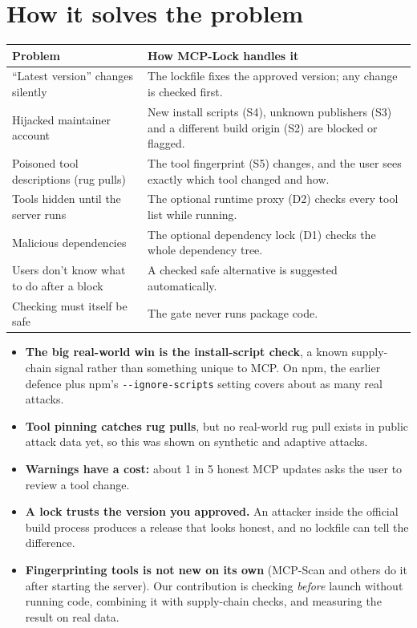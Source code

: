 \documentclass[11pt,a4paper]{article}
\newcommand{\code}[1]{\texttt{#1}}
\begin{document}
\section{How it solves the problem}

\begin{center}
\begin{tabularx}{\textwidth}{@{}>{\raggedright\arraybackslash}p{5.2cm}X@{}}
\toprule
\textbf{Problem} & \textbf{How MCP-Lock handles it} \\
\midrule
``Latest version'' changes silently & The lockfile fixes the approved version; any change is checked first. \\
Hijacked maintainer account & New install scripts (S4), unknown publishers (S3) and a different build origin (S2)
are blocked or flagged. \\
Poisoned tool descriptions (rug pulls) & The tool fingerprint (S5) changes, and the user sees exactly which tool
changed and how. \\
Tools hidden until the server runs & The optional runtime proxy (D2) checks every tool list while running. \\
Malicious dependencies & The optional dependency lock (D1) checks the whole dependency tree. \\
Users don't know what to do after a block & A checked safe alternative is suggested automatically. \\
Checking must itself be safe & The gate never runs package code. \\
\bottomrule
\end{tabularx}
\end{center}

\begin{honest}
\begin{itemize}[leftmargin=*]
  \item \textbf{The big real-world win is the install-script check}, a known supply-chain signal rather than
        something unique to MCP. On npm, the earlier defence plus npm's \code{-{}-ignore-scripts} setting covers about
        as many real attacks.
  \item \textbf{Tool pinning catches rug pulls}, but no real-world rug pull exists in public attack data yet, so
        this was shown on synthetic and adaptive attacks.
  \item \textbf{Warnings have a cost:} about 1 in 5 honest MCP updates asks the user to review a tool change.
  \item \textbf{A lock trusts the version you approved.} An attacker inside the official build process produces a
        release that looks honest, and no lockfile can tell the difference.
  \item \textbf{Fingerprinting tools is not new on its own} (MCP-Scan and others do it after starting the server).
        Our contribution is checking \emph{before} launch without running code, combining it with supply-chain
        checks, and measuring the result on real data.
\end{itemize}
\end{honest}
\end{document}
